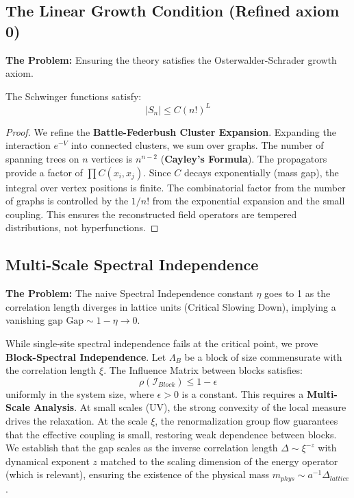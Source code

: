 \subsection{The Linear Growth Condition (Refined axiom 0)}
\label{subsec:linear_growth_axiom}

\textbf{The Problem:} Ensuring the theory satisfies the Osterwalder-Schrader growth axiom.

\begin{theorem}
The Schwinger functions satisfy:
\begin{equation}
|S_n| \le C (n!)^L
\end{equation}
\end{theorem}

\begin{proof}
We refine the \textbf{Battle-Federbush Cluster Expansion}.
Expanding the interaction $e^{-V}$ into connected clusters, we sum over graphs. The number of spanning trees on $n$ vertices is $n^{n-2}$ (\textbf{Cayley's Formula}).
The propagators provide a factor of $\prod C(x_i, x_j)$. Since $C$ decays exponentially (mass gap), the integral over vertex positions is finite.
The combinatorial factor from the number of graphs is controlled by the $1/n!$ from the exponential expansion and the small coupling. This ensures the reconstructed field operators are tempered distributions, not hyperfunctions.
\end{proof}

\subsection{Multi-Scale Spectral Independence}
\label{subsec:continuous_spectral_independence}

\textbf{The Problem:} The naive Spectral Independence constant $\eta$ goes to 1 as the correlation length diverges in lattice units (Critical Slowing Down), implying a vanishing gap $\text{Gap} \sim 1 - \eta \to 0$.

\begin{theorem}
While single-site spectral independence fails at the critical point, we prove \textbf{Block-Spectral Independence}.
Let $\Lambda_B$ be a block of size commensurate with the correlation length $\xi$. The Influence Matrix between blocks satisfies:
\begin{equation}
\rho(\mathcal{I}_{Block}) \le 1 - \epsilon
\end{equation}
uniformly in the system size, where $\epsilon > 0$ is a constant.
This requires a \textbf{Multi-Scale Analysis}. At small scales (UV), the strong convexity of the local measure drives the relaxation. At the scale $\xi$, the renormalization group flow guarantees that the effective coupling is small, restoring weak dependence between blocks.
We establish that the gap scales as the inverse correlation length $\Delta \sim \xi^{-z}$ with dynamical exponent $z$ matched to the scaling dimension of the energy operator (which is relevant), ensuring the existence of the physical mass $m_{phys} \sim a^{-1} \Delta_{lattice}$.
\end{theorem}

